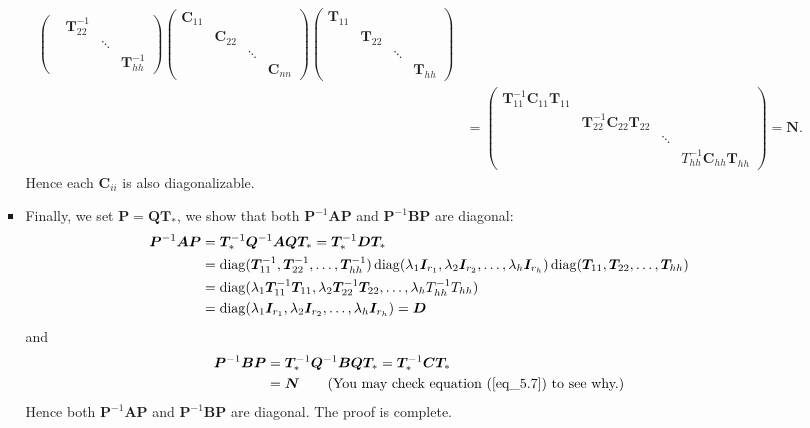 \begin{enumerate}
\begin{enumerate}
\begin{itemize}
\begin{equation}
\begin{aligned}
\begin{pmatrix}
&\bm T_{22}^{-1}&  &\\
&&\ddots&\\
&&&\bm T_{hh}^{-1}
\end{pmatrix}\begin{pmatrix}
\bm C_{11}&  &  &\\
&\bm C_{22}&  &\\
&&\ddots&\\
&&&\bm C_{nn}
\end{pmatrix}\begin{pmatrix}
\bm T_{11}&  &  &\\
&\bm T_{22}&  &\\
&&\ddots&\\
&&&\bm T_{hh}
\end{pmatrix}\\&=
\begin{pmatrix}
\bm T_{11}^{-1}\bm C_{11}\bm T_{11}&  &  &\\
&\bm T_{22}^{-1}\bm C_{22}\bm T_{22}&  &\\
&&\ddots&\\
&&&T_{hh}^{-1}\bm C_{hh}\bm T_{hh}
\end{pmatrix}=\bm N.
\end{aligned}
\end{equation}
Hence each $\bm C_{ii}$ is also diagonalizable.
\item
Finally, we set $\bm P=\bm Q\bm T_{*}$, we show that both $\bm P^{-1}\bm A\bm P$ and $\bm P^{-1}\bm B\bm P$ are diagonal:
\begin{align*}
\bm P^{-1}\bm A\bm P&=\bm T_{*}^{-1}\bm Q^{-1}\bm A\bm Q\bm T_{*}=\bm T_{*}^{-1}\bm D\bm T_{*}\\
&=\operatorname{diag}(\bm T_{11}^{-1},\bm T_{22}^{-1},\dots,\bm T_{hh}^{-1})\operatorname{diag}(\lambda_1\bm I_{r_1},\lambda_2\bm I_{r_2},\dots,\lambda_h\bm I_{r_h})\operatorname{diag}(\bm T_{11},\bm T_{22},\dots,\bm T_{hh})\\
&=\operatorname{diag}(\lambda_1\bm T_{11}^{-1}\bm T_{11},\lambda_2\bm T_{22}^{-1}\bm T_{22},\dots,\lambda_hT_{hh}^{-1}T_{hh})\\
&=\operatorname{diag}(\lambda_1\bm I_{r_1},\lambda_2\bm I_{r_2},\dots,\lambda_h\bm I_{r_h})=\bm D
\end{align*}
and
\begin{align*}
\bm P^{-1}\bm B\bm P&=\bm T_{*}^{-1}\bm Q^{-1}\bm B\bm Q\bm T_{*}=\bm T_{*}^{-1}\bm C\bm T_{*}\\
&=\bm N\qquad\text{(You may check equation $(\ref{eq_5.7})$ to see why.)}
\end{align*}
Hence both $\bm P^{-1}\bm A\bm P$ and $\bm P^{-1}\bm B\bm P$ are diagonal. The proof is complete.

\end{itemize}
\end{enumerate}
\end{enumerate}
